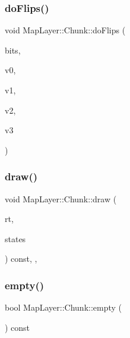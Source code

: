 \mbox{\label{classMapLayer_1_1Chunk_ac90c3c9041c12cf6955707966c20d0cc}} 
\subsubsection{\texorpdfstring{do\+Flips()}{doFlips()}}
{\footnotesize\ttfamily void Map\+Layer\+::\+Chunk\+::do\+Flips (\begin{DoxyParamCaption}\item[{std\+::uint8\+\_\+t}]{bits,  }\item[{sf\+::\+Vector2f $\ast$}]{v0,  }\item[{sf\+::\+Vector2f $\ast$}]{v1,  }\item[{sf\+::\+Vector2f $\ast$}]{v2,  }\item[{sf\+::\+Vector2f $\ast$}]{v3 }\end{DoxyParamCaption})\hspace{0.3cm}{\ttfamily [inline]}}

\mbox{\label{classMapLayer_1_1Chunk_ab2f932fad581f2dd23d1570ebb4c76b9}} 
\subsubsection{\texorpdfstring{draw()}{draw()}}
{\footnotesize\ttfamily void Map\+Layer\+::\+Chunk\+::draw (\begin{DoxyParamCaption}\item[{sf\+::\+Render\+Target \&}]{rt,  }\item[{sf\+::\+Render\+States}]{states }\end{DoxyParamCaption}) const\hspace{0.3cm}{\ttfamily [inline]}, {\ttfamily [override]}, {\ttfamily [private]}}

\mbox{\label{classMapLayer_1_1Chunk_ad7e91d957e932e8c4235f5008cbd03c8}} 
\subsubsection{\texorpdfstring{empty()}{empty()}}
{\footnotesize\ttfamily bool Map\+Layer\+::\+Chunk\+::empty (\begin{DoxyParamCaption}{ }\end{DoxyParamCaption}) const\hspace{0.3cm}{\ttfamily [inline]}}

